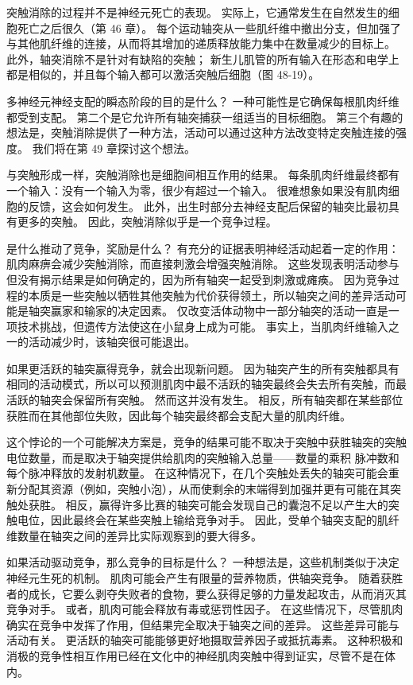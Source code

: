 突触消除的过程并不是神经元死亡的表现。 实际上，它通常发生在自然发生的细胞死亡之后很久（第 46 章）。 每个运动轴突从一些肌纤维中撤出分支，但加强了与其他肌纤维的连接，从而将其增加的递质释放能力集中在数量减少的目标上。 此外，轴突消除不是针对有缺陷的突触； 新生儿肌管的所有输入在形态和电学上都是相似的，并且每个输入都可以激活突触后细胞（图 48-19）。

多神经元神经支配的瞬态阶段的目的是什么？ 一种可能性是它确保每根肌肉纤维都受到支配。 第二个是它允许所有轴突捕获一组适当的目标细胞。 第三个有趣的想法是，突触消除提供了一种方法，活动可以通过这种方法改变特定突触连接的强度。 我们将在第 49 章探讨这个想法。

与突触形成一样，突触消除也是细胞间相互作用的结果。 每条肌肉纤维最终都有一个输入：没有一个输入为零，很少有超过一个输入。 很难想象如果没有肌肉细胞的反馈，这会如何发生。 此外，出生时部分去神经支配后保留的轴突比最初具有更多的突触。 因此，突触消除似乎是一个竞争过程。

是什么推动了竞争，奖励是什么？ 有充分的证据表明神经活动起着一定的作用：肌肉麻痹会减少突触消除，而直接刺激会增强突触消除。 这些发现表明活动参与但没有揭示结果是如何确定的，因为所有轴突一起受到刺激或瘫痪。 因为竞争过程的本质是一些突触以牺牲其他突触为代价获得领土，所以轴突之间的差异活动可能是轴突赢家和输家的决定因素。 仅改变活体动物中一部分轴突的活动一直是一项技术挑战，但遗传方法使这在小鼠身上成为可能。 事实上，当肌肉纤维输入之一的活动减少时，该轴突很可能退出。

如果更活跃的轴突赢得竞争，就会出现新问题。 因为轴突产生的所有突触都具有相同的活动模式，所以可以预测肌肉中最不活跃的轴突最终会失去所有突触，而最活跃的轴突会保留所有突触。 然而这并没有发生。 相反，所有轴突都在某些部位获胜而在其他部位失败，因此每个轴突最终都会支配大量的肌肉纤维。

这个悖论的一个可能解决方案是，竞争的结果可能不取决于突触中获胜轴突的突触电位数量，而是取决于轴突提供给肌肉的突触输入总量——数量的乘积 脉冲数和每个脉冲释放的发射机数量。 在这种情况下，在几个突触处丢失的轴突可能会重新分配其资源（例如，突触小泡），从而使剩余的末端得到加强并更有可能在其突触处获胜。 相反，赢得许多比赛的轴突可能会发现自己的囊泡不足以产生大的突触电位，因此最终会在某些突触上输给竞争对手。 因此，受单个轴突支配的肌纤维数量在轴突之间的差异比实际观察到的要大得多。

如果活动驱动竞争，那么竞争的目标是什么？ 一种想法是，这些机制类似于决定神经元生死的机制。 肌肉可能会产生有限量的营养物质，供轴突竞争。 随着获胜者的成长，它要么剥夺失败者的食物，要么获得足够的力量发起攻击，从而消灭其竞争对手。 或者，肌肉可能会释放有毒或惩罚性因子。 在这些情况下，尽管肌肉确实在竞争中发挥了作用，但结果完全取决于轴突之间的差异。 这些差异可能与活动有关。 更活跃的轴突可能能够更好地摄取营养因子或抵抗毒素。 这种积极和消极的竞争性相互作用已经在文化中的神经肌肉突触中得到证实，尽管不是在体内。

